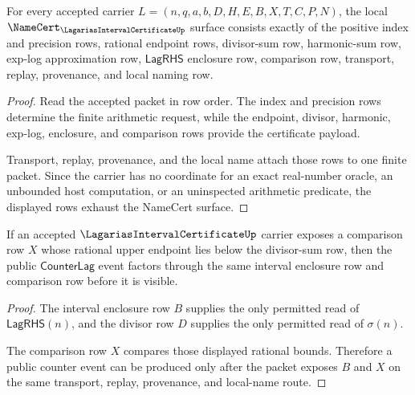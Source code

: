 \begin{theorem}
\label{thm:lagarias-interval-certificate-namecert-obligations}
For every accepted carrier $L=(n,q,a,b,D,H,E,B,X,T,C,P,N)$, the local $\NameCert_{\LagariasIntervalCertificateUp}$ surface consists exactly of the positive index and precision rows, rational endpoint rows, divisor-sum row, harmonic-sum row, exp-log approximation row, $\mathsf{LagRHS}$ enclosure row, comparison row, transport, replay, provenance, and local naming row.
\end{theorem}
\begin{proof}
Read the accepted packet in row order. The index and precision rows determine the finite arithmetic request, while the endpoint, divisor, harmonic, exp-log, enclosure, and comparison rows provide the certificate payload.

Transport, replay, provenance, and the local name attach those rows to one finite packet. Since the carrier has no coordinate for an exact real-number oracle, an unbounded host computation, or an uninspected arithmetic predicate, the displayed rows exhaust the NameCert surface.
\end{proof}

\begin{theorem}
\label{thm:lagarias-interval-certificate-counter-soundness}
If an accepted $\LagariasIntervalCertificateUp$ carrier exposes a comparison row $X$ whose rational upper endpoint lies below the divisor-sum row, then the public $\mathsf{CounterLag}$ event factors through the same interval enclosure row and comparison row before it is visible.
\end{theorem}
\begin{proof}
The interval enclosure row $B$ supplies the only permitted read of $\mathsf{LagRHS}(n)$, and the divisor row $D$ supplies the only permitted read of $\sigma(n)$.

The comparison row $X$ compares those displayed rational bounds. Therefore a public counter event can be produced only after the packet exposes $B$ and $X$ on the same transport, replay, provenance, and local-name route.
\end{proof}



